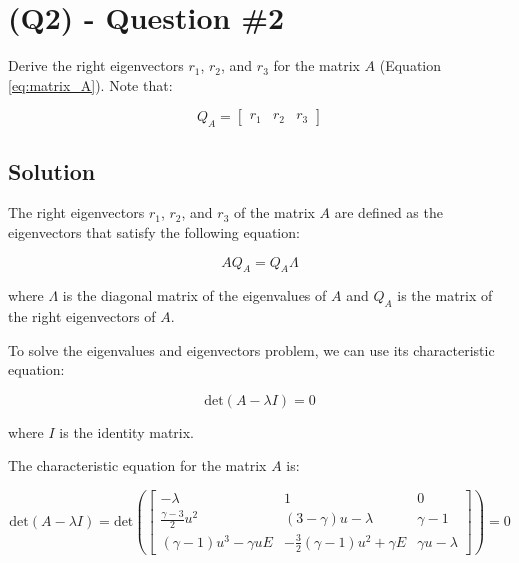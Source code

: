\section{(Q2) - Question \#2}
\label{sec:Q2}

Derive the right eigenvectors $r_1$, $r_2$, and $r_3$ for the matrix $A$ (Equation \ref{eq:matrix_A}).
Note that:

\begin{equation}
    Q_A = \begin{bmatrix}
        r_1 & r_2 & r_3
    \end{bmatrix}
\end{equation}

\subsection{Solution}

The right eigenvectors $r_1$, $r_2$, and $r_3$ of the matrix $A$ are defined as the eigenvectors that satisfy the following equation:

\begin{equation}
    A Q_A = Q_A \Lambda
\end{equation}

where $\Lambda$ is the diagonal matrix of the eigenvalues of $A$ and $Q_A$ is the matrix of the right eigenvectors of $A$.

To solve the eigenvalues and eigenvectors problem, we can use its characteristic equation:

\begin{equation}
    \text{det}(A - \lambda I) = 0
\end{equation}

where $I$ is the identity matrix.

The characteristic equation for the matrix $A$ is:

\begin{equation}
    \text{det}(A - \lambda I) = \text{det}\left( \begin{bmatrix}
            -\lambda                      & 1                                        & 0                  \\
            \frac{\gamma - 3}{2} u^2      & (3 - \gamma) u - \lambda                 & \gamma - 1         \\
            (\gamma - 1) u^3 - \gamma u E & -\frac{3}{2} (\gamma - 1) u^2 + \gamma E & \gamma u - \lambda
        \end{bmatrix} \right) = 0
\end{equation}

